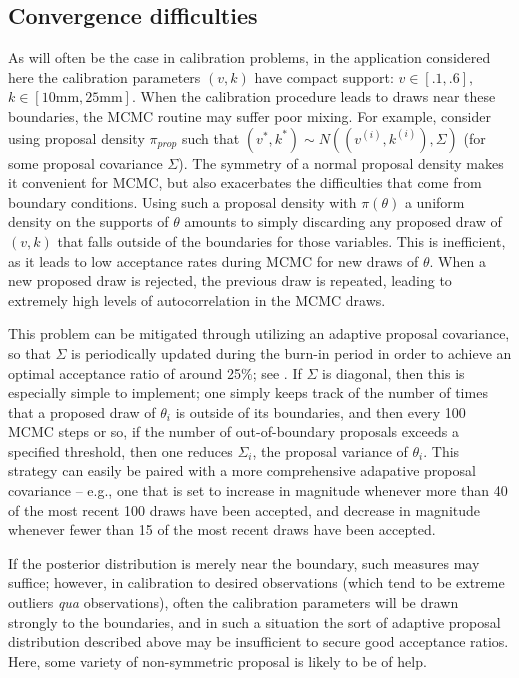 \documentclass{article}
\begin{document}
\subsection{Convergence difficulties}\label{convergence_difficulties}
As will often be the case in calibration problems, in the application considered here the calibration parameters $(v,k)$ have compact support: $v\in [.1,.6],$ $k\in [10\mathrm{mm},25\mathrm{mm}]$. When the calibration procedure leads to draws near these boundaries, the MCMC routine may suffer poor mixing. For example, consider using proposal density $\pi_{prop}$ such that $(v^*,k^*)\sim N((v^{(i)},k^{(i)}),\Sigma)$ (for some proposal covariance $\Sigma$). The symmetry of a normal proposal density makes it convenient for MCMC, but also exacerbates the difficulties that come from boundary conditions. Using such a proposal density with $\pi(\theta)$ a uniform density on the supports of $\theta$ amounts to simply discarding any proposed draw of $(v,k)$ that falls outside of the boundaries for those variables. This is inefficient, as it leads to low acceptance rates during MCMC for new draws of $\theta$. When a new proposed draw is rejected, the previous draw is repeated, leading to extremely high levels of autocorrelation in the MCMC draws.

This problem can be mitigated through utilizing an adaptive proposal covariance, so that $\Sigma$ is periodically updated during the burn-in period in order to achieve an optimal acceptance ratio of around 25\%; see \cite{Roberts1997}. If $\Sigma$ is diagonal, then this is especially simple to implement; one simply keeps track of the number of times that a proposed draw of $\theta_i$ is outside of its boundaries, and then every 100 MCMC steps or so, if the number of out-of-boundary proposals exceeds a specified threshold, then one reduces $\Sigma_i$, the proposal variance of $\theta_i$. This strategy can easily be paired with a more comprehensive adapative proposal covariance -- e.g., one that is set to increase in magnitude whenever more than 40 of the most recent 100 draws have been accepted, and decrease in magnitude whenever fewer than 15 of the most recent draws have been accepted.

If the posterior distribution is merely near the boundary, such measures may suffice; however, in calibration to desired observations (which tend to be extreme outliers \textit{qua} observations), often the calibration parameters will be drawn strongly to the boundaries, and in such a situation the sort of adaptive proposal distribution described above may be insufficient to secure good acceptance ratios. Here, some variety of non-symmetric proposal is likely to be of help.
\end{document}
